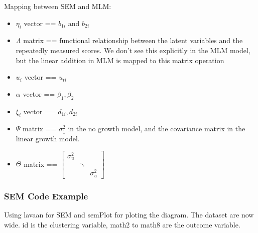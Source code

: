 Mapping between SEM and MLM: 
    \begin{itemize}
        \item $\eta_i$ vector == $b_{1i}$ and $b_{2i}$
        \item $\Lambda$ matrix == functional relationship between the latent variables and the repeatedly measured scores. We don't see this explicitly in the MLM model, but the linear addition in MLM is mapped to this matrix operation
        \item $u_i$ vector == $u_{ti}$ 
        \item $\alpha$ vector == $\beta_1, \beta_2$ 
        \item $\xi_i$ vector == $d_{1i}, d_{2i}$ 
        \item $\Psi$ matrix == $\sigma_1^2$ in the no growth model, and the covariance matrix in the linear growth model. 
        \item $\Theta$ matrix == $\begin{bmatrix}\sigma_u^2 & & \\ & \ddots & \\ &&\sigma_u^2 \end{bmatrix}$
    \end{itemize}

\subsubsection{SEM Code Example} 
Using lavaan for SEM and semPlot for ploting the diagram. The dataset are now wide. id is the clustering variable, math2 to math8 are the outcome variable. 

